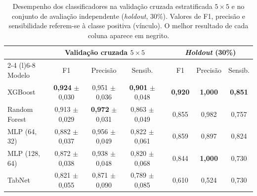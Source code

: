 \begin{table}[htbp]
\centering
\caption{Desempenho dos classificadores na validação cruzada estratificada $5 \times 5$
  e no conjunto de avaliação independente (\textit{holdout}, 30\%).
  Valores de F1, precisão e sensibilidade referem-se à classe positiva (vínculo).
  O melhor resultado de cada coluna aparece em negrito.}
\label{tab:qw1-deep-learning}
\small
\begin{tabular}{@{}l ccc c ccc@{}}
\toprule
& \multicolumn{3}{c}{Validação cruzada $5 \times 5$}
& & \multicolumn{3}{c}{\textit{Holdout} (30\%)} \\
\cmidrule(lr){2-4} \cmidrule(l){6-8}
Modelo & F1 & Precisão & Sensib. & & F1 & Precisão & Sensib. \\
\midrule
XGBoost           & \textbf{0,924} $\pm$ 0,030 & 0,951 $\pm$ 0,036 & \textbf{0,901} $\pm$ 0,048
                  && \textbf{0,920} & \textbf{1,000} & \textbf{0,851} \\
Random Forest     & 0,913 $\pm$ 0,029 & \textbf{0,972} $\pm$ 0,031 & 0,863 $\pm$ 0,049
                  && 0,855 & 0,982 & 0,757 \\
MLP (64, 32)      & 0,882 $\pm$ 0,037 & 0,956 $\pm$ 0,049 & 0,822 $\pm$ 0,061
                  && 0,859 & 0,897 & 0,824 \\
MLP (128, 64)     & 0,872 $\pm$ 0,038 & 0,938 $\pm$ 0,048 & 0,820 $\pm$ 0,068
                  && 0,844 & \textbf{1,000} & 0,730 \\
TabNet            & 0,821 $\pm$ 0,055 & 0,871 $\pm$ 0,090 & 0,789 $\pm$ 0,085
                  && 0,610 & 0,524 & 0,730 \\
\bottomrule
\end{tabular}
\end{table}

